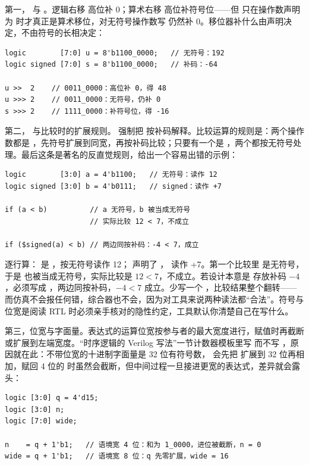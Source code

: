第一，\code{>>} 与 \code{>>>}。逻辑右移 \code{>>} 高位补 0；算术右移 \code{>>>} 高位补符号位——但 \code{>>>} 只在操作数声明为  时才真正是算术移位，对无符号操作数写 \code{>>>} 仍然补 0。移位器补什么由声明决定，不由符号的长相决定：

\begin{lstlisting}
logic        [7:0] u = 8'b1100_0000;   // 无符号：192
logic signed [7:0] s = 8'b1100_0000;   // 补码：-64

u >>  2    // 0011_0000：高位补 0，得 48
u >>> 2    // 0011_0000：无符号，仍补 0
s >>> 2    // 1111_0000：补符号位，得 -16
\end{lstlisting}

第二， 与比较时的扩展规则。 强制把  按补码解释。比较运算的规则是：两个操作数都是 ，先符号扩展到同宽，再按补码比较；只要有一个是 ，两个都按无符号处理。最后这条是著名的反直觉规则，给出一个容易出错的示例：

\begin{lstlisting}
logic        [3:0] a = 4'b1100;   // 无符号：读作 12
logic signed [3:0] b = 4'b0111;   // signed：读作 +7

if (a < b)          // a 无符号，b 被当成无符号
                    // 实际比较 12 < 7，不成立

if ($signed(a) < b) // 两边同按补码：-4 < 7，成立
\end{lstlisting}

逐行算： 是 ，按无符号读作 12； 声明了 ， 读作 +7。第一个比较里  是无符号，于是  也被当成无符号，实际比较是 $12<7$，不成立。若设计本意是  存放补码 $-4$，必须写成 ，两边同按补码，$-4<7$ 成立。少写一个 ，比较结果整个翻转——而仿真不会报任何错，综合器也不会，因为对工具来说两种读法都“合法”。符号与位宽是阅读 RTL 时必须亲手核对的隐性约定，工具默认你清楚自己在写什么。

第三，位宽与字面量。表达式的运算位宽按参与者的最大宽度进行，赋值时再截断或扩展到左端宽度。“时序逻辑的 Verilog 写法”一节计数器模板里写  而不写 ，原因就在此：不带位宽的十进制字面量是 32 位有符号数， 会先把  扩展到 32 位再相加，赋回 4 位的  时虽然会截断，但中间过程一旦接进更宽的表达式，差异就会露头：

\begin{lstlisting}
logic [3:0] q = 4'd15;
logic [3:0] n;
logic [7:0] wide;

n    = q + 1'b1;   // 语境宽 4 位：和为 1_0000，进位被截断，n = 0
wide = q + 1'b1;   // 语境宽 8 位：q 先零扩展，wide = 16
\end{lstlisting}

